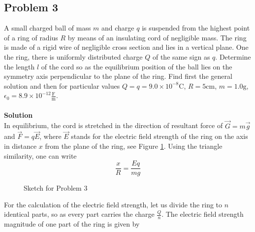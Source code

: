 \documentclass[12pt,a4paper]{book}
\begin{document}
	\subsection*{Problem 3}
	A small charged ball of mass $m$ and charge $q$ is suspended from the highest point of a ring of radius $R$ by means of an insulating cord of negligible mass. The ring is made of a rigid wire of negligible cross section and lies in a vertical plane. One the ring, there is uniformly distributed charge $Q$ of the same sign as $q$. Determine the length $l$ of the cord so as the equilibrium position of the ball lies on the symmetry axis perpendicular to the plane of the ring. Find f\mbox{}irst the general solution and then for particular values $Q=q=9.0\times10^{-8}\text{C}$, $R=5\text{cm}$, $m=1.0\text{g}$, $\epsilon_0=8.9\times10^{-12}\frac{\text{F}}{\text{m}}$.\\ \\
	\textbf{Solution}\\
	In equilibrium, the cord is stretched in the direction of resultant force of $\vec{G}=m\vec{g}$ and $\vec{F}=q\vec{E}$, where $\vec{E}$ stands for the electric f\mbox{}ield strength of the ring on the axis in distance $x$ from the plane of the ring, see Figure \ref{sketch_3_3_1}. Using the triangle similarity, one can write
	\begin{equation*}
		\frac{x}{R}=\frac{Eq}{mg}
	\end{equation*}
	\begin{figure}
		[!hbtp]
		\centering
		\caption{Sketch for Problem 3}
		\label{sketch_3_3_1}
	\end{figure}\par
	For the calculation of the electric f\mbox{}ield strength, let us divide the ring to $n$ identical parts, so as every part carries the charge $\frac{Q}{n}$. The electric f\mbox{}ield strength magnitude of one part of the ring is given by
\end{document}
